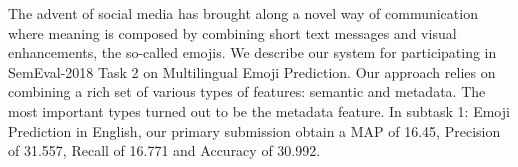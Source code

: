 The advent of social media has brought along a novel way of communication where meaning is composed by combining short text messages and visual enhancements, the so-called emojis. We describe our system for participating in SemEval-2018 Task 2 on Multilingual Emoji Prediction. Our approach relies on combining a rich set of various types of features: semantic and metadata. The most important types turned out to be the metadata feature. In subtask 1: Emoji Prediction in English, our primary submission obtain a MAP of 16.45, Precision of 31.557, Recall of 16.771 and Accuracy of 30.992.

